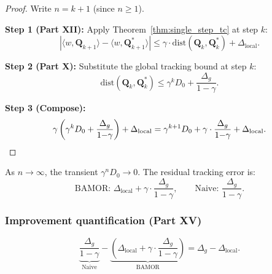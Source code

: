 \begin{proof}
Write $n = k + 1$ (since $n \ge 1$).

\textbf{Step 1 (Part XII):} Apply Theorem~\ref{thm:single_step_tc} at step $k$:
\begin{equation}
    |\langle w, \mathbf{Q}_{k+1} \rangle - \langle w, \mathbf{Q}^*_{k+1} \rangle| \le \gamma \cdot \mathrm{dist}(\mathbf{Q}_k, \mathbf{Q}^*_k) + \Delta_{\mathrm{local}}.
\end{equation}

\textbf{Step 2 (Part X):} Substitute the global tracking bound at step $k$:
\begin{equation}
    \mathrm{dist}(\mathbf{Q}_k, \mathbf{Q}^*_k) \le \gamma^k D_0 + \frac{\Delta_g}{1{-}\gamma}.
\end{equation}

\textbf{Step 3 (Compose):}
\begin{align}
    \gamma \left(\gamma^k D_0 + \frac{\Delta_g}{1{-}\gamma}\right) + \Delta_{\mathrm{local}} = \gamma^{k+1} D_0 + \gamma \cdot \frac{\Delta_g}{1{-}\gamma} + \Delta_{\mathrm{local}}. \qedhere
\end{align}
\end{proof}

\begin{remark}
As $n \to \infty$, the transient $\gamma^n D_0 \to 0$.  The residual tracking error is:
\begin{equation}
    \text{BAMOR: } \Delta_{\mathrm{local}} + \gamma \cdot \frac{\Delta_g}{1{-}\gamma}, \qquad \text{Naive: } \frac{\Delta_g}{1{-}\gamma}.
\end{equation}
\end{remark}

\subsubsection{Improvement quantification (Part XV)}

\begin{theorem}
\label{thm:improvement}
\begin{equation}
    \underbrace{\frac{\Delta_g}{1{-}\gamma}}_{\text{Naive}} - \underbrace{\left(\Delta_{\mathrm{local}} + \gamma \cdot \frac{\Delta_g}{1{-}\gamma}\right)}_{\text{BAMOR}} = \Delta_g - \Delta_{\mathrm{local}}.
\end{equation}
\end{theorem}

